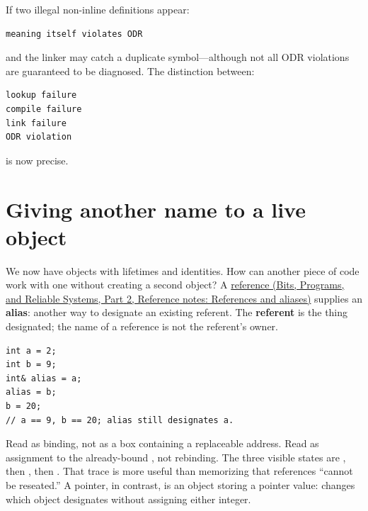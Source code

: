 If two illegal non-inline definitions appear:

\begin{verbatim}
meaning itself violates ODR
\end{verbatim}

and the linker may catch a duplicate symbol---although not all ODR violations are guaranteed to be diagnosed. The distinction between:

\begin{verbatim}
lookup failure
compile failure
link failure
ODR violation
\end{verbatim}

is now precise.

\section{Giving another name to a live object}\label{05-engine-i-ch003-giving-another-name-to-a-live-object}

\hypertarget{05-engine-i-ch003-giving-another-name-to-a-live-object}{}

We now have objects with lifetimes and identities. How can another piece of code work with one without creating a second object? A \href{../01-Bits-Programs-and-Reliable-Systems-P02/main.pdf\#appendix-d6d562ca9fbb}{reference (Bits, Programs, and Reliable Systems, Part 2, Reference notes: References and aliases)} supplies an \textbf{alias}: another way to designate an existing referent. The \textbf{referent} is the thing designated; the name of a reference is not the referent's owner.

\begin{verbatim}
int a = 2;
int b = 9;
int& alias = a;
alias = b;
b = 20;
// a == 9, b == 20; alias still designates a.
\end{verbatim}

Read  as binding, not as a box containing a replaceable address. Read  as assignment to the already-bound , not rebinding. The three visible states are , then , then . That trace is more useful than memorizing that references ``cannot be reseated.'' A pointer, in contrast, is an object storing a pointer value:  changes which object  designates without assigning either integer.

